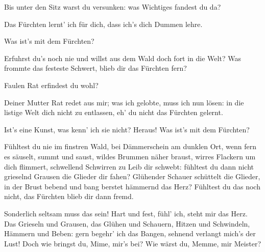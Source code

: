 \begin{drama}
\Siegfriedspeaks


Bis unter den Sitz
warst du versunken:
was Wichtiges fandest du da?

\Mimespeaks


Das Fürchten lernt' ich für dich,
dass ich's dich Dummen lehre.

\Siegfriedspeaks


Was ist's mit dem Fürchten?

\Mimespeaks

Erfuhrst du's noch nie
und willst aus dem Wald
doch fort in die Welt?
Was frommte das festeste Schwert,
blieb dir das Fürchten fern?

\Siegfriedspeaks


Faulen Rat
erfindest du wohl?

\Mimespeaks


Deiner Mutter Rat
redet aus mir;
was ich gelobte,
muss ich nun lösen:
in die listige Welt
dich nicht zu entlassen,
eh' du nicht das Fürchten gelernt.

\Siegfriedspeaks


Ist's eine Kunst,
was kenn' ich sie nicht?
Heraus! Was ist's mit dem Fürchten?

\Mimespeaks

Fühltest du nie
im finstren Wald,
bei Dämmerschein
am dunklen Ort,
wenn fern es säuselt,
summt und saust,
wildes Brummen
näher braust,
wirres Flackern
um dich flimmert,
schwellend Schwirren
zu Leib dir schwebt:
fühltest du dann nicht grieselnd
Grausen die Glieder dir fahen?
Glühender Schauer
schüttelt die Glieder,
in der Brust bebend und bang
berstet hämmernd das Herz?
Fühltest du das noch nicht,
das Fürchten blieb dir dann fremd.

\Siegfriedspeaks


Sonderlich seltsam
muss das sein!
Hart und fest,
fühl' ich, steht mir das Herz.
Das Grieseln und Grausen,
das Glühen und Schauern,
Hitzen und Schwindeln,
Hämmern und Beben:
gern begehr' ich das Bangen,
sehnend verlangt mich's der Lust!
Doch wie bringst du,
Mime, mir's bei?
Wie wärst du, Memme, mir Meister?


\end{drama}
